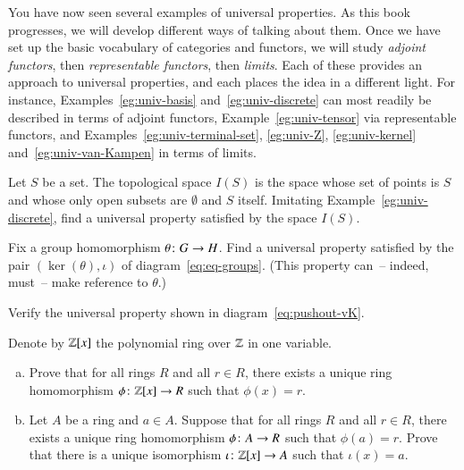 You have now seen several examples of universal properties.  As this book
progresses, we will develop different ways of talking about them.  Once we
have set up the basic vocabulary of categories and functors, we will study
\emph{adjoint functors}, then \emph{representable functors}, then
\emph{limits}.  Each of these provides an approach to universal properties,
and each places the idea in a different light.  For instance,
Examples~\ref{eg:univ-basis} and~\ref{eg:univ-discrete} can most readily be
described in terms of adjoint functors, Example~\ref{eg:univ-tensor} via
representable functors, and Examples~\ref{eg:univ-terminal-set},
\ref{eg:univ-Z}, \ref{eg:univ-kernel} and~\ref{eg:univ-van-Kampen} in terms
of limits.%
%


\exs


\begin{iquestion}
Let $S$ be a set.  The %
%
%
%
topological space $I(S)$%
%
%
is the space whose set of points is $S$ and whose only open subsets are
$\emptyset$ and $S$ itself.  Imitating Example~\ref{eg:univ-discrete}, find
a universal property satisfied by the space $I(S)$.
\end{iquestion}


\begin{iquestion}
\label{ex:ker-groups}
Fix a group homomorphism $\theta\from G \to H$.  Find a universal property
satisfied by the pair $(\ker(\theta), \iota)$%
%
%
of diagram~\eqref{eq:eq-groups}.  (This property can~-- indeed, must~-- make
reference to $\theta$.)
\end{iquestion}


\begin{iquestion}
Verify the universal property shown in diagram~\eqref{eq:pushout-vK}.
\end{iquestion}


\begin{iquestion}
\label{ex:Zx}
Denote by $\mathbb{Z}[x]$%
%
%
the polynomial%
%
%
ring over $\mathbb{Z}$ in one variable.
%
\begin{enumerate}[(b)]
\item
\label{part:Zx-main}
Prove that for all rings $R$ and all $r \in R$, there exists a unique ring
homomorphism $\phi\from \integers[x] \to R$ such that $\phi(x) = r$.

\item
Let $A$ be a ring and $a \in A$.  Suppose that for all rings $R$ and all
$r \in R$, there exists a unique ring homomorphism $\phi\from A \to R$ such that
$\phi(a) = r$.  Prove that there is a unique isomorphism $\iota\from
\integers[x] \to A$ such that $\iota(x) = a$.
\end{enumerate}
\end{iquestion}


